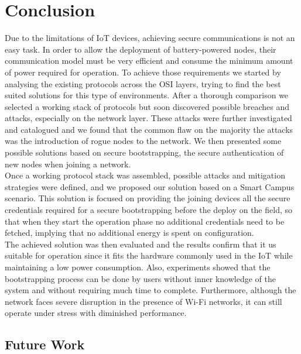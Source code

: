 
\chapter{Conclusion}
\label{chapter:conclusion}
Due to the limitations of \gls{IoT} devices, achieving secure communications is not an easy task. In order to allow the deployment of battery-powered nodes, their communication model must be very efficient and consume the minimum amount of power required for operation. To achieve those requirements we started by analysing the existing protocols across the OSI layers, trying to find the best suited solutions for this type of environments. After a thorough comparison we selected a working stack of protocols but soon discovered possible breaches and attacks, especially on the network layer. These attacks were further investigated and catalogued and we found that the common flaw on the majority the attacks was the introduction of rogue nodes to the network. We then presented some possible solutions based on secure bootstrapping, the secure authentication of new nodes when joining a network.\\
Once a working protocol stack was assembled, possible attacks and mitigation strategies were defined, and we proposed our solution based on a Smart Campus scenario. This solution is focused on providing the joining devices all the secure credentials required for a secure bootstrapping before the deploy on the field, so that when they start the operation phase no additional credentials need to be fetched, implying that no additional energy is spent on configuration.\\
The achieved solution was then evaluated and the results confirm that it us suitable for operation since it fits the hardware commonly used in the \gls{IoT} while maintaining a low power consumption. Also, experiments showed that the bootstrapping process can be done by users without inner knowledge of the system and without requiring much time to complete. Furthermore, although the network faces severe disruption in the presence of Wi-Fi networks, it can still operate under stress with diminished performance.

\section{Future Work}

